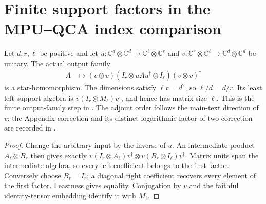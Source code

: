 \section{Finite support factors in the MPU--QCA index comparison}

\begin{lemma}
    \label{lem:mpu_actual_two_link_left_support}
    \leanok
    Let $d,r,\ell$ be positive and let
    $u:\mathbb C^d\otimes\mathbb C^d\to\mathbb C^\ell\otimes\mathbb C^r$
    and $v:\mathbb C^r\otimes\mathbb C^\ell\to\mathbb C^d\otimes\mathbb C^d$
    be unitary. The actual output family
    \begin{align}
        A & \longmapsto(v\otimes v)
        (I_r\otimes uAu^\dagger\otimes I_\ell)(v\otimes v)^\dagger
        \label{eq:mpu_actual_two_link_output_family}
    \end{align}
    is a star-homomorphism. The dimensions satisfy $\ell r=d^2$, so
    $\ell/d=d/r$. Its least left support algebra is
    $v(I_r\otimes M_\ell)v^\dagger$, and hence has matrix size $\ell$.
    This is the finite output-family step in
    \cite[Appendix, lines~2322--2334]{Cirac2017MPU}.
    The adjoint order follows the main-text direction of $v$; the
    Appendix correction and its distinct logarithmic factor-of-two
    correction are recorded in \cite{gap:mpu_qca_index_normalization}.
\end{lemma}
\begin{proof}\leanok
    Change the arbitrary input by the inverse of $u$. An intermediate
    product $A_\ell\otimes B_r$ then gives exactly
    $v(I_r\otimes A_\ell)v^\dagger\otimes
        v(B_r\otimes I_\ell)v^\dagger$. Matrix units span the intermediate
    algebra, so every left coefficient belongs to the first factor.
    Conversely choose $B_r=I_r$; a diagonal right coefficient recovers
    every element of the first factor. Leastness gives equality.
    Conjugation by $v$ and the faithful identity-tensor embedding
    identify it with $M_\ell$.
\end{proof}

